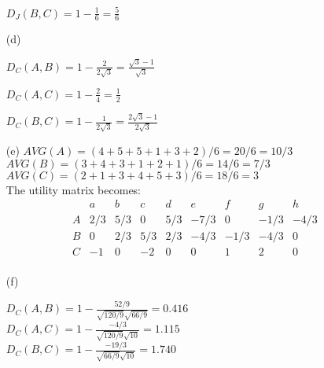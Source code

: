 \documentclass{article}
\begin{document}
\begin{enumerate}
        \(D_J(B,C) = 1 - \frac{1}{6} = \frac{5}{6}\)
    \item[(d)]

        \(D_C(A,B) = 1 - \frac{2}{2\sqrt{3}} = \frac{\sqrt{3}-1}{\sqrt{3}}\)

        \(D_C(A,C) = 1 - \frac{2}{4} = \frac{1}{2}\)

        \(D_C(B,C) = 1 - \frac{1}{2\sqrt{3}} = \frac{2\sqrt{3}-1}{2\sqrt{3}}\)
    
    \item[(e)]
        \( AVG(A) = (4+5+5+1+3+2)/6 = 20/6 = 10/3 \) \\
        \( AVG(B) = (3+4+3+1+2+1)/6 = 14/6 = 7/3\) \\
        \( AVG(C) = (2+1+3+4+5+3)/6 = 18/6 = 3\) \\

        The utility matrix becomes:
        \[
        \begin{array}{c|cccccccc}
        & a & b & c & d & e & f & g & h \\
        \hline
        A & 2/3 & 5/3 & 0 & 5/3 & -7/3 & 0 & -1/3 & -4/3 \\
        B & 0 & 2/3 & 5/3 & 2/3 & -4/3 & -1/3 & -4/3 & 0 \\
        C & -1 & 0 & -2 & 0 & 0 & 1 & 2 & 0\\
        \end{array}
        \]
    \item[(f)]

    \(D_C(A,B) = 1 - \frac{52/9}{\sqrt{120/9}\sqrt{66/9}} =  0.416 \) \\
    \(D_C(A,C) = 1 - \frac{-4/3}{\sqrt{120/9}\sqrt{10}} = 1.115 \) \\
    \(D_C(B,C) = 1 - \frac{-19/3}{\sqrt{66/9}\sqrt{10}} = 1.740 \)

\end{enumerate}
\end{document}
